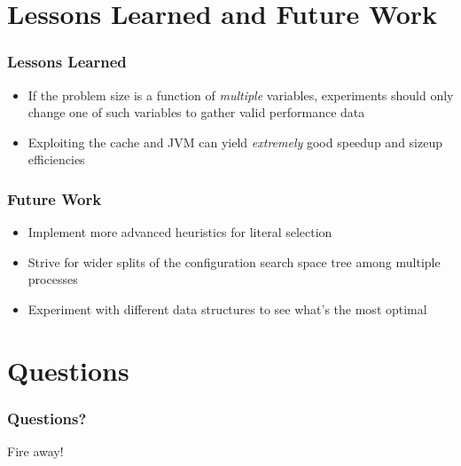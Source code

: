 \documentclass[handout,10pt]{beamer}
\begin{document}
\section{Lessons Learned and Future Work}
\begin{frame}
	\frametitle{Lessons Learned}
	\begin{itemize}
		\item If the problem size is a function of \emph{multiple} variables, experiments should only change one 
		of such variables to gather valid performance data
		\item Exploiting the cache and JVM can yield \emph{extremely} good speedup and sizeup efficiencies
	\end{itemize}
\end{frame}

\begin{frame}
	\frametitle{Future Work}
	\begin{itemize}
		\item Implement more advanced heuristics for literal selection
		\item Strive for wider splits of the configuration search space tree among multiple processes 
		\item Experiment with different data structures to see what's the most optimal
	\end{itemize}
\end{frame}

\section{Questions}
\begin{frame}
	\frametitle{Questions?}
	\begin{center}
		Fire away!
	\end{center}
\end{frame}

\end{document}
